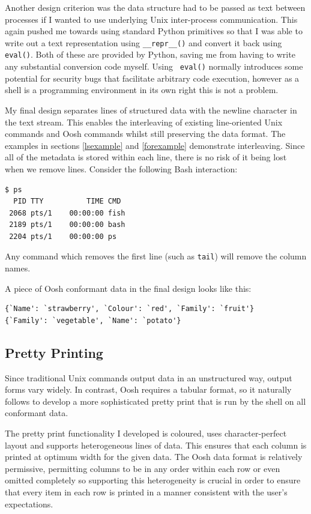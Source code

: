 \documentclass[12pt,twoside,notitlepage]{report}
\begin{document}
Another design criterion was the data structure had to be passed as
text between processes if I wanted to use underlying Unix
inter-process communication. This again pushed me towards using
standard Python primitives so that I was able to write out a text
representation using {\tt \_\_repr\_\_()} and convert it back using
{\tt eval()}. Both of these are provided by Python, saving me from
having to write any substantial conversion code myself. Using {\tt
  eval()} normally introduces some potential for security bugs that
facilitate arbitrary code execution, however as a shell is a
programming environment in its own right this is not a problem.

My final design separates lines of structured data with the newline
character in the text stream. This enables the interleaving of
existing line-oriented Unix commands and Oosh commands whilst still
preserving the data format. The examples in sections \ref{lsexample}
and \ref{forexample} demonstrate interleaving. Since all of the metadata is
stored within each line, there is no risk of it being lost when we
remove lines. Consider the following Bash interaction:

\begin{verbatim}
$ ps
  PID TTY          TIME CMD
 2068 pts/1    00:00:00 fish
 2189 pts/1    00:00:00 bash
 2204 pts/1    00:00:00 ps
\end{verbatim}

Any command which removes the first line (such as {\tt tail}) will remove
the column names.

A piece of Oosh conformant data in the final design looks like this:

\begin{verbatim}
{`Name': `strawberry', `Colour': `red', `Family': `fruit'}
{`Family': `vegetable', `Name': `potato'}
\end{verbatim}

\subsection{Pretty Printing}
\label{prettyimpl}
Since traditional Unix commands output data in an unstructured way,
output forms vary widely. In contrast, Oosh requires a tabular format,
so it naturally follows to develop a more sophisticated pretty print
that is run by the shell on all conformant data.

The pretty print functionality I developed is coloured, uses
character-perfect layout and supports heterogeneous lines of
data. This ensures that each column is printed at optimum width for
the given data. The Oosh data format is relatively permissive,
permitting columns to be in any order within each row or even omitted
completely so supporting this heterogeneity is crucial in order to
ensure that every item in each row is printed in a manner consistent
with the user's expectations.
\end{document}
